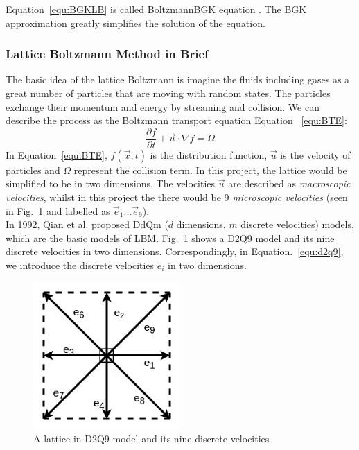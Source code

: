 Equation~\ref{equ:BGKLB} is called Boltzmann\-BGK equation \cite{chew1956boltzmann}. The BGK approximation greatly simplifies the solution of the equation.\\

\subsubsection{Lattice Boltzmann Method in Brief} \label{sec:lbmb}
The basic idea of the lattice Boltzmann is imagine the fluids including gases as a great number of particles that are moving with random states. The particles exchange their momentum and energy by streaming and collision. We can describe the process as the Boltzmann transport equation Equation ~\ref{equ:BTE}:
\begin{equation}
\label{equ:BTE}
    \frac{\partial f}{\partial t} + \vec{u}\cdot \nabla f = \Omega
\end{equation}
In Equation~\ref{equ:BTE}, $f(\vec{x}, t)$ is the distribution function, $\vec{u}$ is the velocity of particles and $\Omega$ represent the collision term. In this project, the lattice would be simplified to be in two dimensions. The velocities $\vec{u}$ are described as \textit{macroscopic velocities}, whilst in this project the there would be 9 \textit{microscopic velocities} (seen in Fig.~\ref{fig:d2q9} and labelled as $\vec{e}_1...\vec{e}_9$). \\

In 1992, Qian et al. \cite{d2q9} proposed DdQm ($d$ dimensions, $m$ discrete velocities) models, which are the basic models of LBM. Fig.~\ref{fig:d2q9} shows a D2Q9 model and its nine discrete velocities in two dimensions. Correspondingly, in Equation.~\ref{equ:d2q9}, we introduce the discrete velocities $e_i$ in two dimensions.\\



\begin{figure}[!tb]
   \centering
       \includegraphics[width=0.5\textwidth]{figures/nine_direction.jpg}
       \caption{A lattice in D2Q9 model and its nine discrete velocities}
       \label{fig:d2q9}
\end{figure}

